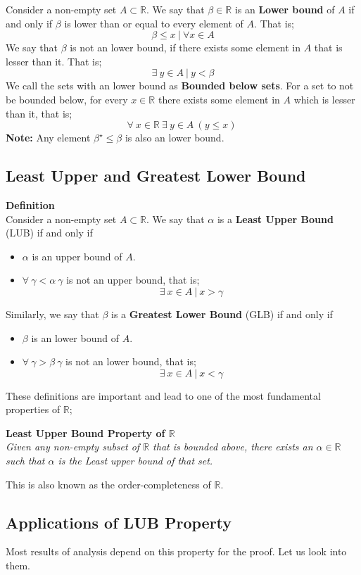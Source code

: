 \documentclass[english,course]{lecture}
\begin{document}
Consider a non-empty set $A \subset \mathbb{R}$. We say that $\beta \in \mathbb{R}$ is an \textbf{Lower bound} of $A$ if and only if $\beta$ is lower than or equal to every element of $A$. That is;
$$ \beta \leq x \ | \ \forall x \in A $$
We say that $\beta$ is not an lower bound, if there exists some element in $A$ that is lesser than it. That is;
$$ \exists \ y \in A \ | \ y < \beta $$
We call the sets with an lower bound as \textbf{Bounded below sets}. For a set to not be bounded below, for every $x \in \mathbb{R}$ there exists some element in $A$ which is lesser than it, that is;
$$ \forall \ x \in \mathbb{R} \ \exists \ y \in A \ (y \leq x) \ $$
\textbf{Note:}
Any element $\beta^{\star} \leq \beta$ is also an lower bound.

\subsection{Least Upper and Greatest Lower Bound}
\textbf{Definition} \\
Consider a non-empty set $A \subset \mathbb{R}$. We say that $\alpha$ is a \textbf{Least Upper Bound} (LUB) if and only if 
\begin{itemize}
\item $\alpha$ is an upper bound of $A$.
\item $\forall \ \gamma < \alpha \ \gamma$ is not an upper bound, that is;
$$ \exists \ x \in A \ | \ x > \gamma$$
\end{itemize}
Similarly, we say that $\beta$ is a \textbf{Greatest Lower Bound} (GLB) if and only if 
\begin{itemize}
\item $\beta$ is an lower bound of $A$.
\item $\forall \ \gamma > \beta \ \gamma$ is not an lower bound, that is;
$$ \exists \ x \in A \ | \ x < \gamma$$
\end{itemize}

These definitions are important and lead to one of the most fundamental properties of $\mathbb{R}$;
\begin{center}
\textbf{Least Upper Bound Property of $\mathbb{R}$} \\
\emph{Given any non-empty subset of $\mathbb{R}$ that is bounded above, there exists an $\alpha \in \mathbb{R}$ such that $\alpha$ is the Least upper bound of that set.}
\end{center}
This is also known as the order-completeness of $\mathbb{R}$.

\subsection{Applications of LUB Property}
Most results of analysis depend on this property for the proof. Let us look into them.
\end{document}
